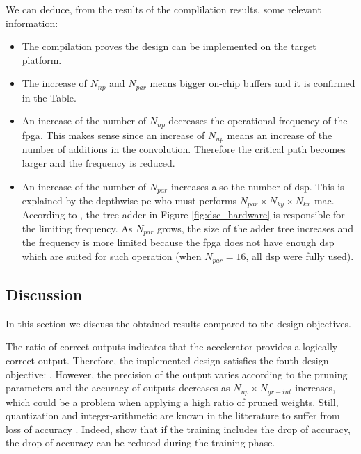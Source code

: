 We can deduce, from the results of the complilation results, some relevant information:
\begin{itemize}
    \item The compilation proves the design can be implemented on the target platform.
    \item The increase of $N_{np}$ and $N_{par}$ means bigger on-chip buffers and it is confirmed in the Table.
    \item An increase of the number of $N_{np}$ decreases the operational frequency of the \acrshort{fpga}. This makes sense since an increase of $N_{np}$ means an increase of the number of additions in the convolution. Therefore the critical path becomes larger and the frequency is reduced.
    \item An increase of the number of $N_{par}$ increases also the number of \acrshort{dsp}. This is explained by the depthwise \acrshort{pe} who must performs $N_{par} \times N_{ky} \times N_{kx}$ \acrshort{mac}. According to \textcite{bai_cnn_2018}, the tree adder in Figure \ref{fig:dsc_hardware} is responsible for the limiting frequency. As $N_{par}$ grows, the size of the adder tree increases and the frequency is more limited because the \acrshort{fpga} does not have enough \acrshort{dsp} which are suited for such operation (when $N_{par} = 16$, all \acrshort{dsp} were fully used).
\end{itemize}
%
\subsection{Discussion} \label{subs:discus}
%
In this section we discuss the obtained results compared to the design objectives.

The ratio of correct outputs indicates that the accelerator provides a logically correct output. Therefore, the implemented design satisfies the fouth design objective: . However, the precision of the output varies according to the pruning parameters and the accuracy of outputs decreases as $N_{np} \times N_{gr-int}$ increases, which could be a problem when applying a high ratio of pruned weights. Still, quantization and integer-arithmetic are known in the litterature to suffer from loss of accuracy \cite{wu_quantized_2016, jacob_quantization_2017}. Indeed, \textcite{wu_quantized_2016, jacob_quantization_2017} show that if the training includes the drop of accuracy, the drop of accuracy can be reduced during the training phase.

